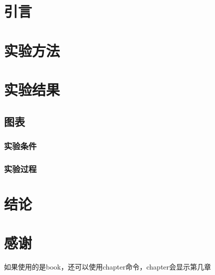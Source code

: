\documentclass{article}
\begin{document}
    \tableofcontents
    
    \section{引言}
    \section{实验方法}
    \section{实验结果}
    \subsection{图表}
    \subsubsection{实验条件}
    \subsubsection{实验过程}
    \section{结论}
    \section{感谢}
    如果使用的是book，还可以使用chapter命令，chapter会显示第几章
\end{document}
